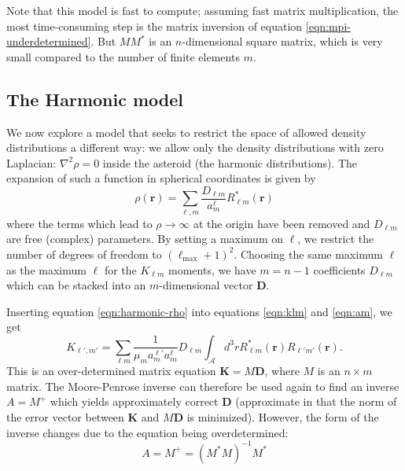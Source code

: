 \documentclass[fleqn,usenatbib]{mnras}
\begin{document}
Note that this model is fast to compute; assuming fast matrix multiplication, the most time-consuming step is the matrix inversion of equation \ref{eqn:mpi-underdetermined}. But $MM^*$ is an $n$-dimensional square matrix, which is very small compared to the number of finite elements $m$.




\subsection{The Harmonic model}
We now explore a model that seeks to restrict the space of allowed density distributions a different way: we allow only the density distributions with zero Laplacian: $\nabla^2 \rho = 0$ inside the asteroid (the harmonic distributions). The expansion of such a function in spherical coordinates is given by 
\begin{equation}
  \rho(\bm r) = \sum_{\ell, m} \frac{D_{\ell m}}{a_m^\ell} R_{\ell m}^*(\bm r)
  \label{eqn:harmonic-rho}
\end{equation}
where the terms which lead to $\rho \rightarrow \infty$ at the origin have been removed and $D_{\ell m}$ are free (complex) parameters. By setting a maximum on $\ell$, we restrict the number of degrees of freedom to $(\ell_\mathrm{max}+ 1)^2$. Choosing the same maximum $\ell$ as the maximum $\ell$ for the $K_{\ell m}$ moments, we have $m=n-1$ coefficients $D_{\ell m}$ which can be stacked into an $m$-dimensional vector $\bm D$.

Inserting equation \ref{eqn:harmonic-rho} into equations \ref{eqn:klm} and \ref{eqn:am}, we get 
\begin{equation}
  K_{\ell', m'} = \sum_{\ell m} \frac{1}{\mu_m a_m^{\ell'} a_m^\ell} D_{\ell m} \int_\mathcal{A} d^3 r R_{\ell m}^*(\bm r) R_{\ell' m'}(\bm r).
  \label{eqn:harmonic-mat}
\end{equation}
This is an over-determined matrix equation $\bm K = M \bm D$, where $M$ is an $n \times m$ matrix. The Moore-Penrose inverse can therefore be used again to find an inverse $A=M^+$ which yields approximately correct $\bm D$ (approximate in that the norm of the error vector between $\bm K$ and $M \bm D$ is minimized). However, the form of the inverse changes due to the equation being overdetermined:
\begin{equation}
  A=M^+ = (M^*M)^{-1} M^*
  \label{eqn:mpi-overdetermined}
\end{equation}
\end{document}
